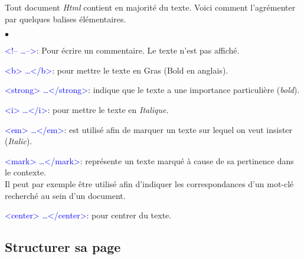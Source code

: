 \documentclass[10pt,dvipsnames, dvips, svgnames]{article}
\begin{document}
Tout document \textit{Html} contient en majorité du texte. Voici comment l'agrémenter par quelques balises élémentaires.


\begin{list}{$\bullet$}{}
\item   \textcolor{Blue}{<!-- \dots -->}: Pour écrire un commentaire. Le texte n'est pas affiché.
\item   \textcolor{Blue}{<b> \dots </b>}: pour mettre le texte en   Gras (Bold en anglais).
\item   \textcolor{Blue}{<strong> \dots </strong>}: indique que le texte a une importance particulière (\textit{bold}).
\item   \textcolor{Blue}{<i> \dots </i>}:   pour mettre le texte en   \textit{Italique}.
\item   \textcolor{Blue}{<em> \dots </em>}:  est utilisé afin de marquer un texte sur lequel on veut insister (\textit{Italic}).
\item   \textcolor{Blue}{<mark> \dots </mark>}: représente un texte marqué  à cause de sa pertinence dans le contexte. \\
Il peut par exemple être utilisé afin d'indiquer les correspondances d'un mot-clé recherché au sein d'un document.
\item   \textcolor{Blue}{<center> \dots </center>}: pour centrer du texte.
\end{list}


\subsection{Structurer sa page}
\end{document}
